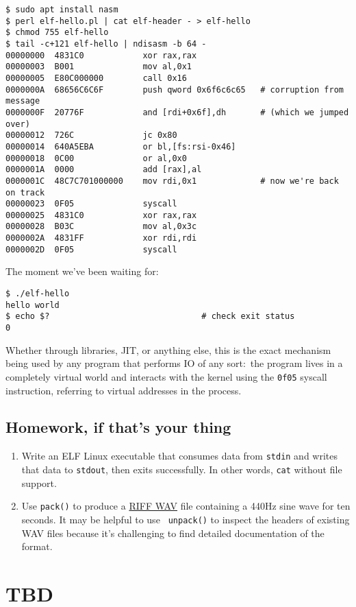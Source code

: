 \documentclass{article}
\newcommand{\lnk}[2]{\href{#1}{\textcolor[rgb]{1.0,0.0,0.0}{#2}}}
\begin{document}
  \begin{verbatim}
$ sudo apt install nasm
$ perl elf-hello.pl | cat elf-header - > elf-hello
$ chmod 755 elf-hello
$ tail -c+121 elf-hello | ndisasm -b 64 -
00000000  4831C0            xor rax,rax
00000003  B001              mov al,0x1
00000005  E80C000000        call 0x16
0000000A  68656C6C6F        push qword 0x6f6c6c65   # corruption from message
0000000F  20776F            and [rdi+0x6f],dh       # (which we jumped over)
00000012  726C              jc 0x80
00000014  640A5EBA          or bl,[fs:rsi-0x46]
00000018  0C00              or al,0x0
0000001A  0000              add [rax],al
0000001C  48C7C701000000    mov rdi,0x1             # now we're back on track
00000023  0F05              syscall
00000025  4831C0            xor rax,rax
00000028  B03C              mov al,0x3c
0000002A  4831FF            xor rdi,rdi
0000002D  0F05              syscall\end{verbatim}

  The moment we've been waiting for:

  \begin{verbatim}
$ ./elf-hello
hello world
$ echo $?                               # check exit status
0\end{verbatim}

  Whether through libraries, JIT, or anything else, this is the exact mechanism
  being used by any program that performs IO of any sort:~the program lives in a
  completely virtual world and interacts with the kernel using the {\tt 0f05}
  syscall instruction, referring to virtual addresses in the process.

  \subsection{Homework, if that's your thing}
  \begin{enumerate}
    \item Write an ELF Linux executable that consumes data from {\tt stdin} and
          writes that data to {\tt stdout}, then exits successfully. In other
          words, {\tt cat} without file support.
    \item Use {\tt pack()} to produce a
          \lnk{https://en.wikipedia.org/wiki/WAV}{RIFF WAV} file containing a
          440Hz sine wave for ten seconds. It may be helpful to use {\tt
          unpack()} to inspect the headers of existing WAV files because it's
          challenging to find detailed documentation of the format.
  \end{enumerate}


  \section{TBD}
\end{document}
